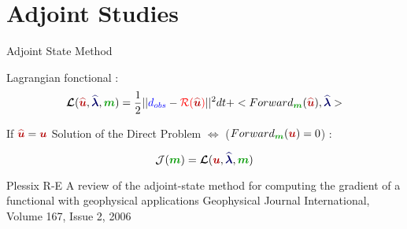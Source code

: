 \section{Adjoint Studies}
\renewcommand\tikzscale{1.3}



\begin{frame}{Adjoint State Method}

Lagrangian fonctional \cite{plessix} :
  \begin{equation}
    \Lag(\qcqU,\qcqLbd,\model) = \frac{1}{2}||\textcolor{blue}{d_{obs}}-\textcolor{red}{\mathcal{R}(\qcqU)}||^2dt + <\DP(\qcqU),\qcqLbd>
  \end{equation}

    If $\qcqU=\contU$ Solution of the Direct Problem $\Longleftrightarrow$ ($\DP(\contU) = 0$) :

  \begin{equation}
    \CF(\model) = \Lag(\contU,\qcqLbd,\model)
  \end{equation}



  \vfill
  \tiny
  \begin{thebibliography}{1}
   Plessix R-E
    \newblock A review of the adjoint-state method for computing the gradient
of a functional with geophysical applications
    \newblock Geophysical Journal International, Volume 167, Issue 2, 2006
  \end{thebibliography}

\end{frame}












